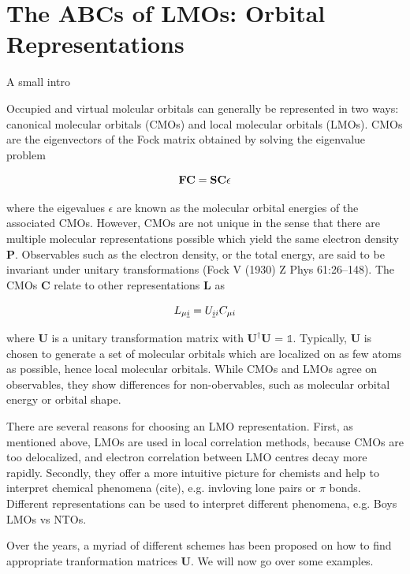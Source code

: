 \section{The ABCs of LMOs: Orbital Representations}

A small intro


Occupied and virtual molcular orbitals can generally be represented in two ways: canonical molecular orbitals (CMOs) and local molecular orbitals (LMOs). CMOs are the eigenvectors of the Fock matrix obtained by solving the eigenvalue problem

\begin{equation}
\mathbf{F}\mathbf{C} = \mathbf{S}\mathbf{C} \epsilon
\end{equation}

where the eigevalues $\epsilon$ are known as the molecular orbital energies of the associated CMOs. However, CMOs are not unique in the sense that there are multiple molecular representations possible which yield the same electron density $\mathbf{P}$. Observables such as the electron density, or the total energy, are said to be invariant under unitary transformations (Fock V (1930) Z Phys 61:26–148). The CMOs $\mathbf{C}$ relate to other representations $\mathbf{L}$ as

\begin{equation}
L_{\mu \underline{i}} = U_{\underline{i} i} C_{\mu i}
\end{equation}

\noindent where $\mathbf{U}$ is a unitary transformation matrix with $\mathbf{U}^{\dagger} \mathbf{U}$ = $\mathbb{1}$. Typically, $\mathbf{U}$ is chosen to generate a set of molecular orbitals which are localized on as few atoms as possible, hence local molecular orbitals. While CMOs and LMOs agree on observables, they show differences for non-obervables, such as molecular orbital energy or orbital shape.

There are several reasons for choosing an LMO representation. First, as mentioned above, LMOs are used in local correlation methods, because CMOs are too delocalized, and electron correlation between LMO centres decay more rapidly. Secondly, they offer a more intuitive picture for chemists and help to interpret chemical phenomena (cite), e.g. invloving lone pairs or $\pi$ bonds. Different representations can be used to interpret different phenomena, e.g. Boys LMOs vs NTOs.

Over the years, a myriad of different schemes has been proposed on how to find appropriate tranformation matrices $\mathbf{U}$. We will now go over some examples.

